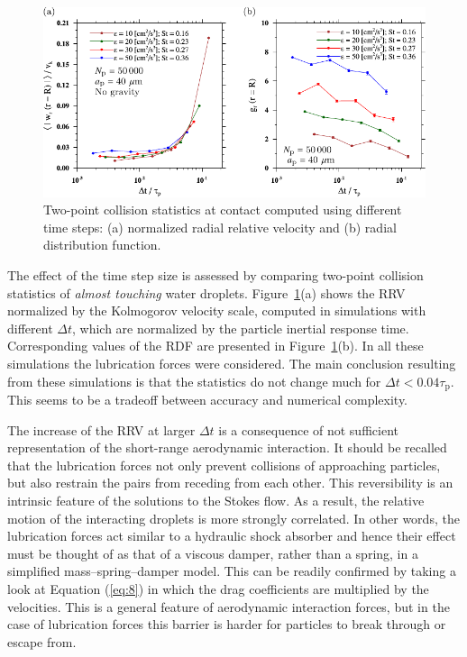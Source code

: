 \documentclass[../thesis.tex]{subfiles}
\begin{document}
\begin{figure}%
\center
\includegraphics[width=\textwidth]{../figs/JFM/fig2.pdf}
\caption{Two-point collision statistics at contact computed using different time steps: (a) normalized radial relative velocity and (b) radial distribution function.}
\label{Fig2}
\end{figure}%

The effect of the time step size is assessed by comparing two-point collision statistics of \emph{almost touching} water droplets. Figure~\ref{Fig2}(a) shows the RRV normalized by the Kolmogorov velocity scale, computed in simulations with different $\Delta t$, which are normalized by the particle inertial response time. Corresponding values of the RDF are presented in Figure~\ref{Fig2}(b). In all these simulations the lubrication forces were considered. The main conclusion resulting from these simulations is that the statistics do not change much for $\Delta t < 0.04 \tau_\text{p}$. This seems to be a tradeoff between accuracy and numerical complexity.

The increase of the RRV at larger $\Delta t$ is a consequence of not sufficient representation of the short-range aerodynamic interaction. It should be recalled that the lubrication forces not only prevent collisions of approaching particles, but also restrain the pairs from receding from each other. This reversibility is an intrinsic feature of the solutions to the Stokes flow. As a result, the relative motion of the interacting droplets is more strongly correlated. In other words, the lubrication forces act similar to a hydraulic shock absorber and hence their effect must be thought of as that of a viscous damper, rather than a spring, in a simplified mass--spring--damper model. This can be readily confirmed by taking a look at Equation (\ref{eq:8}) in which the drag coefficients are multiplied by the velocities. This is a general feature of aerodynamic interaction forces, but in the case of lubrication forces this barrier is harder for particles to break through or escape from.
\end{document}
